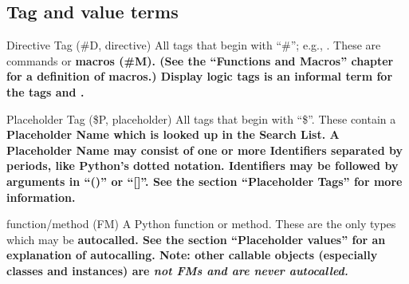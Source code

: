 \subsection{Tag and value terms}

\begin{description}

\item{Directive Tag (#D, directive)}  All tags that begin with ``#''; e.g.,
     .  These are commands or \bf{macros (#M)}.  (See the
     ``Functions and Macros'' chapter for a definition of macros.)
     \bf{Display logic tags} is an informal term for the tags 
      and .

\item{Placeholder Tag (\$P, placeholder)}  All tags that begin with ``\$''.
     These contain a \bf{Placeholder Name} which is looked up in the Search
     List.  A Placeholder Name may consist of one or more \bf{Identifiers}
     separated by periods, like Python's dotted notation.  Identifiers may
     be followed by \bf{arguments} in ``()'' or ``[]''.  See the section
     ``Placeholder Tags'' for more information.

\item{function/method (FM)}  A Python function or method.  These are the only
     types which may be \bf{autocalled}.  See the section ``Placeholder 
     values'' for an explanation of autocalling.  Note: other callable objects
     (especially classes and instances) are \em{not} FMs and are never
     autocalled.

\end{description}

